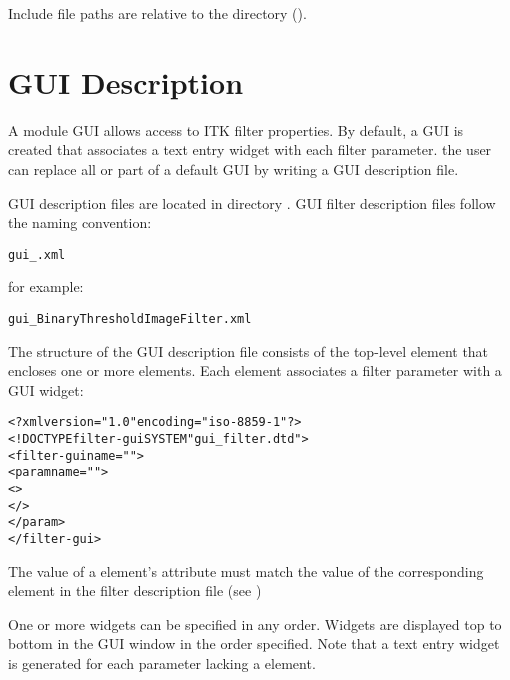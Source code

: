 Include file paths are relative to the \sr{}  directory
().

\section{\sr{} GUI Description}
\label{sec:itk_mods:sr_gui_desc}

A module GUI allows access to ITK filter properties.  By default, a
GUI is created that associates a text entry widget with each filter
parameter.  the user can replace
all or part of a default GUI by writing a GUI description file. 

\sr{} GUI description files are located in directory
.
\sr{} GUI filter description files follow the naming
convention:

\begin{alltt}
  gui\_.xml
\end{alltt}

for example:

\begin{alltt}
  gui\_BinaryThresholdImageFilter.xml
\end{alltt}



The structure of the GUI description file consists of the
top-level element  that encloses one or more
 elements.  Each  element
associates a filter parameter with a GUI widget:

\begin{alltt}
  <?xml version="1.0"  encoding="iso-8859-1"?>
  <!DOCTYPE filter-gui SYSTEM "gui_filter.dtd">
  <filter-gui name="">
    <param name="">
      <>
      \velide
      </>
      \velide
    </param>
    \velide  
  </filter-gui>
\end{alltt}

The value of a  element's 
attribute must match the value of the corresponding
 element in the filter description file (see
)

One or more widgets can be specified in any order. Widgets are
displayed top to bottom in the GUI window in the order specified. Note
that a text entry widget is generated for each parameter lacking a
 element.

